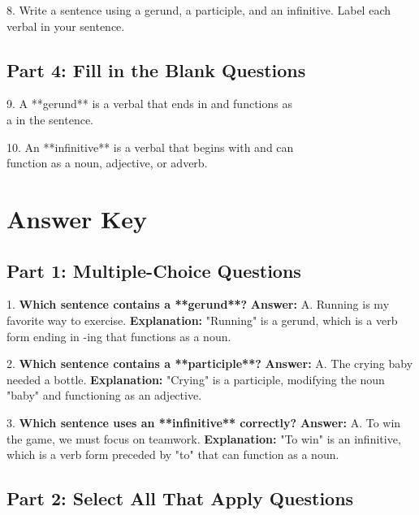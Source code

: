 \documentclass[12pt]{article}
\begin{document}
8. Write a sentence using a gerund, a participle, and an infinitive. Label each \\verbal in your sentence.  
\vspace{4cm}

\subsection*{Part 4: Fill in the Blank Questions}
\vspace{1cm}
9. A **gerund** is a verbal that ends in \underline{\hspace{4cm}} and functions as \\a \underline{\hspace{4cm}} in the sentence.  
\vspace{2cm}

10. An **infinitive** is a verbal that begins with \underline{\hspace{4cm}} and can \\function as a noun, adjective, or adverb.  
\vspace{2cm}
\newpage
\section*{Answer Key}

\subsection*{Part 1: Multiple-Choice Questions}

1. \textbf{Which sentence contains a **gerund**?}  
\textbf{Answer:} A. Running is my favorite way to exercise.  
\textbf{Explanation:} "Running" is a gerund, which is a verb form ending in -ing that functions as a noun.

\vspace{1cm}
2. \textbf{Which sentence contains a **participle**?}  
\textbf{Answer:} A. The crying baby needed a bottle.  
\textbf{Explanation:} "Crying" is a participle, modifying the noun "baby" and functioning as an adjective.

\vspace{1cm}
3. \textbf{Which sentence uses an **infinitive** correctly?}  
\textbf{Answer:} A. To win the game, we must focus on teamwork.  
\textbf{Explanation:} "To win" is an infinitive, which is a verb form preceded by "to" that can function as a noun.

\subsection*{Part 2: Select All That Apply Questions}
\end{document}
